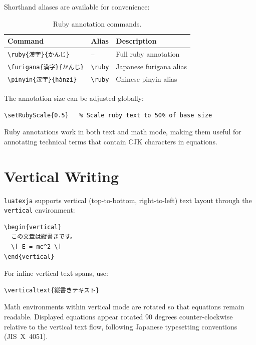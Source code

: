 Shorthand aliases are available for convenience:

\begin{table}[htbp]
  \centering
  \caption{Ruby annotation commands.}
  \label{tab:ruby-commands}
  \begin{tabular}{@{}lll@{}}
    \toprule
    Command & Alias & Description \\
    \midrule
    \texttt{\textbackslash ruby\{漢字\}\{かんじ\}} & -- & Full ruby annotation \\
    \texttt{\textbackslash furigana\{漢字\}\{かんじ\}} & \texttt{\textbackslash ruby} & Japanese furigana alias \\
    \texttt{\textbackslash pinyin\{汉字\}\{hànzì\}} & \texttt{\textbackslash ruby} & Chinese pinyin alias \\
    \bottomrule
  \end{tabular}
\end{table}

The annotation size can be adjusted globally:

\begin{verbatim}
\setRubyScale{0.5}   % Scale ruby text to 50% of base size
\end{verbatim}

Ruby annotations work in both text and math mode, making them useful for
annotating technical terms that contain CJK characters in equations.

\section{Vertical Writing}

\texttt{luatexja} supports vertical (top-to-bottom, right-to-left) text
layout through the \texttt{vertical} environment:

\begin{verbatim}
\begin{vertical}
  この文章は縦書きです。
  \[ E = mc^2 \]
\end{vertical}
\end{verbatim}

For inline vertical text spans, use:

\begin{verbatim}
\verticaltext{縦書きテキスト}
\end{verbatim}

Math environments within vertical mode are rotated so that equations
remain readable.  Displayed equations appear rotated 90 degrees
counter-clockwise relative to the vertical text flow, following Japanese
typesetting conventions (JIS~X~4051).

